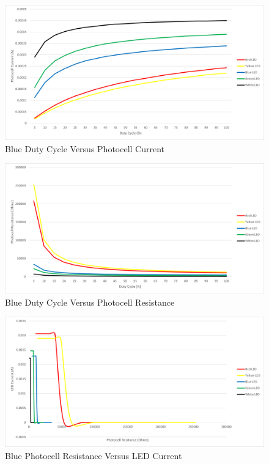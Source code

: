 \documentclass[12pt,titlepage]{article}
\begin{document}
\begin{figure}[!htb]
  \centering
  \includegraphics[width=5in]{lab_4/duty_cycle_photo_curr.png}
  \caption{Blue Duty Cycle Versus Photocell Current}
\end{figure}
\begin{figure}[!htb]
\centering
\includegraphics[width=5in]{lab_4/duty_cycle_photo_res.png}
\caption{Blue Duty Cycle Versus Photocell Resistance}
\end{figure}
\begin{figure}[!htb]
  \centering
  \includegraphics[width=5in]{lab_4/photo_res_led_curr.png}
  \caption{Blue Photocell Resistance Versus LED Current}
\end{figure}
\end{document}
